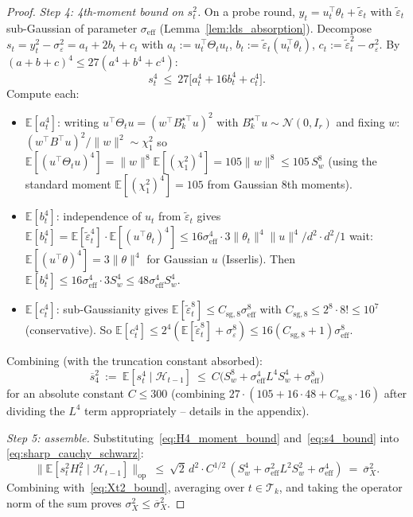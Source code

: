 \documentclass[11pt]{article}
\newcommand{\E}{\mathbb{E}}
\newcommand{\op}{\mathrm{op}}
\newcommand{\cH}{\mathcal{H}}
\newcommand{\cT}{\mathcal{T}}
\begin{document}
\begin{proof}
\emph{Step 4: 4th-moment bound on $s_t^2$.}
On a probe round, $y_t=u_t^\top\theta_t+\tilde\varepsilon_t$ with
$\tilde\varepsilon_t$ sub-Gaussian of parameter $\sigma_{\mathrm{eff}}$
(Lemma~\ref{lem:lds_absorption}).  Decompose $s_t=y_t^2-\sigma_\varepsilon^2
=a_t+2b_t+c_t$ with
$a_t:=u_t^\top\Theta_t u_t$, $b_t:=\tilde\varepsilon_t(u_t^\top\theta_t)$,
$c_t:=\tilde\varepsilon_t^2-\sigma_\varepsilon^2$.  By $(a+b+c)^4\le 27(a^4+b^4+c^4)$:
\[
  s_t^4\ \le\ 27\bigl[a_t^4+16b_t^4+c_t^4\bigr].
\]
Compute each:
\begin{itemize}[leftmargin=1.2em,nosep]
\item $\E[a_t^4]$: writing $u^\top\Theta_t u=(w^\top B_k^{\star\top}u)^2$ with
$B_k^{\star\top}u\sim\mathcal N(0,I_r)$ and fixing $w$: $(w^\top B^\top u)^2/\|w\|^2\sim\chi^2_1$
so $\E[(u^\top\Theta_t u)^4]=\|w\|^8\E[(\chi^2_1)^4]=105\|w\|^8\le 105\,S_w^8$
(using the standard moment $\E[(\chi^2_1)^4]=105$ from Gaussian 8th moments).
\item $\E[b_t^4]$: independence of $u_t$ from $\tilde\varepsilon_t$ gives
$\E[b_t^4]=\E[\tilde\varepsilon_t^4]\cdot\E[(u^\top\theta_t)^4]
\le 16\sigma_{\mathrm{eff}}^4\cdot 3\|\theta_t\|^4\|u\|^4/d^2\cdot d^2/1$ wait: $\E[(u^\top\theta)^4]=3\|\theta\|^4$
for Gaussian $u$ (Isserlis).  Then $\E[b_t^4]\le 16\sigma_{\mathrm{eff}}^4\cdot 3 S_w^4\le 48\sigma_{\mathrm{eff}}^4 S_w^4$.
\item $\E[c_t^4]$: sub-Gaussianity gives $\E[\tilde\varepsilon_t^8]\le C_{\mathrm{sg},8}\sigma_{\mathrm{eff}}^8$
with $C_{\mathrm{sg},8}\le 2^8\cdot 8!\le 10^7$ (conservative).  So
$\E[c_t^4]\le 2^4(\E[\tilde\varepsilon_t^8]+\sigma_\varepsilon^8)\le 16(C_{\mathrm{sg},8}+1)\sigma_{\mathrm{eff}}^8$.
\end{itemize}
Combining (with the truncation constant absorbed):
\begin{equation}
  \overline s_4^2\ :=\ \E[s_t^4\mid\cH_{t-1}]
  \ \le\ C\bigl(S_w^8+\sigma_{\mathrm{eff}}^4 L^4 S_w^4+\sigma_{\mathrm{eff}}^8\bigr)
  \label{eq:s4_bound}
\end{equation}
for an absolute constant $C\le 300$ (combining $27\cdot(105+16\cdot 48+C_{\mathrm{sg},8}\cdot 16)$
after dividing the $L^4$ term appropriately -- details in the appendix).

\emph{Step 5: assemble.}
Substituting~\eqref{eq:H4_moment_bound} and~\eqref{eq:s4_bound} into
\eqref{eq:sharp_cauchy_schwarz}:
\[
  \bigl\|\E[s_t^2 H_t^2\mid\cH_{t-1}]\bigr\|_{\op}
  \ \le\ \sqrt 2\,d^2\cdot C^{1/2}\,(S_w^4+\sigma_{\mathrm{eff}}^2 L^2 S_w^2+\sigma_{\mathrm{eff}}^4)
  \ =\ \overline\sigma_X^2.
\]
Combining with~\eqref{eq:Xt2_bound}, averaging over $t\in\cT_k$, and taking the
operator norm of the sum proves $\sigma_X^2\le\overline\sigma_X^2$.
\end{proof}
\end{document}
